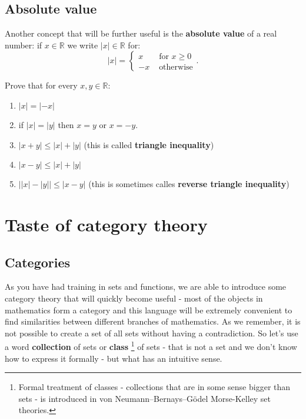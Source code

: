 \subsection{Absolute value}

Another concept that will be further useful is the \textbf{absolute value} of a real number:
if $x\in \mathbb R$ we write $|x|\in \mathbb R$ for:
$$|x| = \begin{cases}x &\text{ for } x \ge 0\\ -x &\text{ otherwise} \end{cases}.$$

\begin{prob}
  Prove that for every $x,y\in \mathbb R$:
  \begin{enumerate}
    \item $|x|=|-x|$
    \item if $|x|=|y|$ then $x=y$ or $x=-y$.
    \item $|x+y| \le |x| + |y|$ (this is called \textbf{triangle inequality})
    \item $|x-y|\le |x| + |y|$
    \item $\left||x| - |y|\right|\le |x-y|$ (this is sometimes calles \textbf{reverse triangle inequality})
  \end{enumerate}
\end{prob}

\section{Taste of category theory}
\subsection{Categories}
As you have had training in sets and functions, we are able to introduce some category theory that will quickly become useful - most of the objects in mathematics form a
category and this language will be extremely convenient to find similarities between different branches of mathematics.
As we remember, it is not possible to create a set of all sets without having a contradiction. So let's use a word \textbf{collection} of sets or \textbf{class}
\footnote{Formal treatment of classes - collections that are in some sense bigger than sets - is introduced in von Neumann–Bernays–Gödel Morse-Kelley set theories.}
 of sets - that is not a set and we don't know how to express it formally - but what has an intuitive sense.

